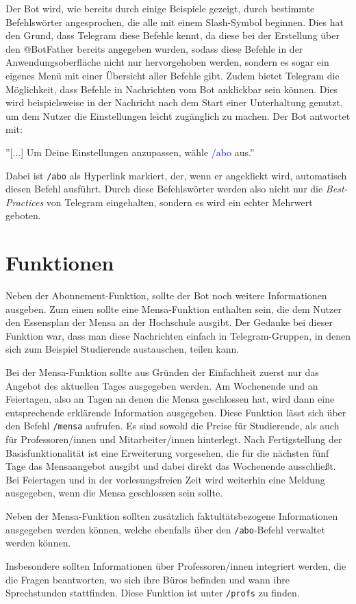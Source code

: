 Der Bot wird, wie bereits durch einige Beispiele gezeigt, durch bestimmte Befehlswörter angesprochen, die alle mit einem Slash-Symbol beginnen. Dies hat den Grund, dass Telegram diese Befehle kennt, da diese bei der Erstellung über den @BotFather bereits angegeben wurden, sodass diese Befehle in der Anwendungsoberfläche nicht nur hervorgehoben werden, sondern es sogar ein eigenes Menü mit einer Übersicht aller Befehle gibt. Zudem bietet Telegram die Möglichkeit, dass Befehle in Nachrichten vom Bot anklickbar sein können. Dies wird beispielsweise in der Nachricht nach dem Start einer Unterhaltung genutzt, um dem Nutzer die Einstellungen leicht zugänglich zu machen. Der Bot antwortet mit:

''[...] Um Deine Einstellungen anzupassen, wähle \textcolor{blue}{/abo} aus.''

Dabei ist \texttt{/abo} als Hyperlink markiert, der, wenn er angeklickt wird, automatisch diesen Befehl ausführt. Durch diese Befehlswörter werden also nicht nur die \emph{Best-Practices} von Telegram eingehalten, sondern es wird ein echter Mehrwert geboten.

\section{Funktionen}
Neben der Abonnement-Funktion, sollte der Bot noch weitere Informationen ausgeben. Zum einen sollte eine Mensa-Funktion enthalten sein, die dem Nutzer den Essensplan der Mensa an der Hochschule ausgibt. Der Gedanke bei dieser Funktion war, dass man diese Nachrichten einfach in Telegram-Gruppen, in denen sich zum Beispiel Studierende austauschen, teilen kann.

Bei der Mensa-Funktion sollte aus Gründen der Einfachheit zuerst nur das Angebot des aktuellen Tages ausgegeben werden. Am Wochenende und an Feiertagen, also an Tagen an denen die Mensa geschlossen hat, wird dann eine entsprechende erklärende Information ausgegeben. Diese Funktion lässt sich über den Befehl \texttt{/mensa} aufrufen. Es sind sowohl die Preise für Studierende, als auch für Professoren/innen und Mitarbeiter/innen hinterlegt.
Nach Fertigstellung der Basisfunktionalität ist eine Erweiterung vorgesehen, die für die nächsten fünf Tage das Mensaangebot ausgibt und dabei direkt das Wochenende ausschließt. Bei Feiertagen und in der vorlesungsfreien Zeit wird weiterhin eine Meldung ausgegeben, wenn die Mensa geschlossen sein sollte.

Neben der Mensa-Funktion sollten zusätzlich faktultätsbezogene Informationen ausgegeben werden können, welche ebenfalls über den \texttt{/abo}-Befehl verwaltet werden können.

Insbesondere sollten Informationen über Professoren/innen integriert werden, die die Fragen beantworten, wo sich ihre Büros befinden und wann ihre Sprechstunden stattfinden. Diese Funktion ist unter \texttt{/profs} zu finden.
